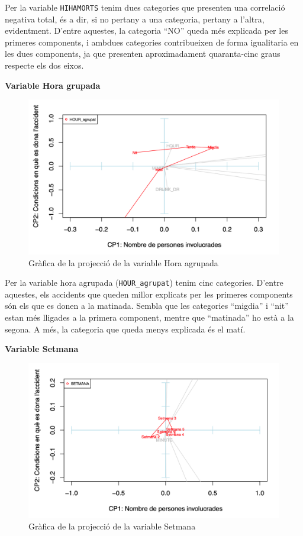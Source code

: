 \documentclass[12pt,longbibliography]{article}
\theoremstyle{definition}
\theoremstyle{remark}
\begin{document}
Per la variable \texttt{HIHAMORTS} tenim dues categories que presenten una correlació negativa total, és a dir, si no pertany a una categoria, pertany a l'altra, evidentment. D'entre aquestes, la categoria ``NO'' queda més explicada per les primeres components, i ambdues categories contribueixen de forma igualitaria en les dues components, ja que presenten aproximadament quaranta-cinc graus respecte els dos eixos.


\textbf{Variable Hora grupada}

\begin{figure}[H]
\begin{center}
\includegraphics[width=12cm]{acp11}
\end{center}
\caption{Gràfica de la projecció de la variable Hora agrupada}
\label{fig:ACP11}
\end{figure}

Per la variable hora agrupada (\texttt{HOUR\_agrupat}) tenim cinc categories. D'entre aquestes, els accidents que queden millor explicats per les primeres components són els que es donen a la matinada. Sembla que les categories ``migdia'' i ``nit'' estan més lligades a la primera component, mentre que ``matinada'' ho està a la segona. A més, la categoria que queda menys explicada és el matí.



\textbf{Variable Setmana}

\begin{figure}[H]
\begin{center}
\includegraphics[width=12cm]{acp12}
\end{center}
\caption{Gràfica de la projecció de la variable Setmana}
\label{fig:ACP12}
\end{figure}
\end{document}
